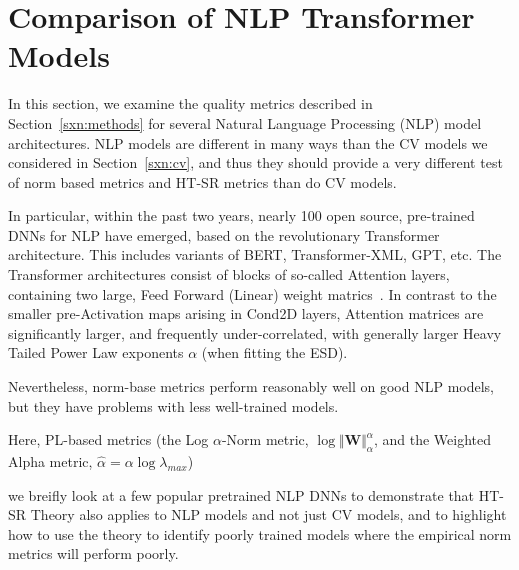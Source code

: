 \section{Comparison of NLP Transformer Models}
\label{sxn:nlp}

In this section, we examine the quality metrics described in Section~\ref{sxn:methods} for several Natural Language Processing (NLP) model architectures.
NLP models are different in many ways than the CV models we considered in Section~\ref{sxn:cv}, and thus they should provide a very different test of norm based metrics and HT-SR metrics than do CV models.

In particular, within the past two years, nearly 100 open source, pre-trained DNNs for NLP have emerged, based on the revolutionary Transformer architecture.
This includes variants of BERT, Transformer-XML, GPT, etc.
The Transformer architectures consist of blocks of so-called Attention layers, containing two large, Feed Forward (Linear) weight matrics~\cite{Attn2017}. 
In contrast to the smaller pre-Activation maps arising in Cond2D layers, Attention matrices are significantly larger, 
and frequently under-correlated, with generally larger Heavy Tailed Power Law exponents $\alpha$ (when fitting the ESD).  

Nevertheless, norm-base metrics perform reasonably well on good NLP models, but they have problems with less well-trained models.

Here, PL-based metrics 
(the Log $\alpha$-Norm metric, $\log\Vert\mathbf{W}\Vert_{\alpha}^{\alpha}$, and the Weighted Alpha metric, $\hat\alpha =\alpha\log\lambda_{max} $)

we breifly look at a few popular pretrained NLP DNNs to demonstrate that HT-SR Theory 
also
applies to NLP models and not just CV models, and to highlight how to use the theory to identify
poorly trained models where the empirical norm metrics will perform poorly.




